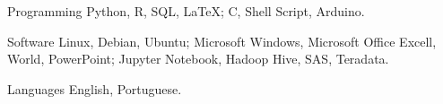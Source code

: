 


\begin{cvskills}


\cvskill
{Programming} %
{\newline Python, R, SQL, \LaTeX;
\newline C, Shell Script, Arduino. \newline} %


\cvskill
{Software} %
{Linux, Debian, Ubuntu;\newline
Microsoft Windows, Microsoft Office Excell, World, PowerPoint;\newline
Jupyter Notebook, Hadoop Hive, SAS, Teradata.\newline
} %




\cvskill
{Languages} %
{\newline English, Portuguese.\newline} %


\end{cvskills}